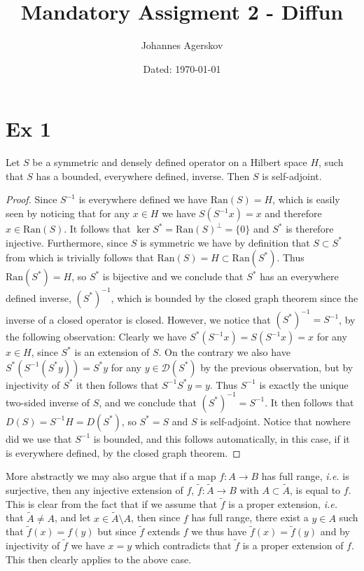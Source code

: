 \documentclass[a4paper,11pt]{article}
\author{Johannes Agerskov}
\date{Dated: \today}
\title{Mandatory Assigment 2 - Diffun}
\newcommand{\Ran}[1]{\text{Ran}\left(#1\right)}
\newcommand{\ie}{\emph{i.e.} }
\numberwithin{equation}{section}
\begin{document}
\maketitle	

\section*{Ex 1}
\setcounter{section}{1}
Let $ S $ be a symmetric and densely defined operator on a Hilbert space $ H $, such that $ S $ has a bounded, everywhere defined, inverse. Then $ S $ is self-adjoint.
\begin{proof}
	Since $ S^{-1} $ is everywhere defined we have $ \Ran{S}=H $, which is easily seen by noticing that for any $ x\in H $ we have $ S(S^{-1}x)=x $ and therefore $ x\in \Ran{S} $. It follows that $ \ker{S^*}=\Ran{S}^\perp=\{0\} $ and $ S^* $ is therefore injective. Furthermore, since $ S $ is symmetric we have by definition that $ S\subset S^* $ from which is trivially follows that $ \Ran{S}=H\subset\Ran{S^*} $. Thus $ \Ran{S^*}=H $, so $ S^* $ is bijective and we conclude that $ S^* $ has an everywhere defined inverse, $ (S^*)^{-1} $, which is bounded by the closed graph theorem since the inverse of a closed operator is closed. However, we notice that $ (S^*)^{-1}=S^{-1} $, by the following observation: Clearly we have $ S^*(S^{-1}x)=S(S^{-1}x)=x $ for any $ x\in H $, since $ S^* $ is an extension of $ S $. On the contrary we also have $ S^*(S^{-1}(S^*y))=S^*y $ for any $ y\in\mathcal{D}(S^*) $ by the previous observation, but by injectivity of $ S^* $ it then follows that $ S^{-1}S^*y=y $. Thus $ S^{-1} $ is exactly the unique two-sided inverse of $ S $, and we conclude that $ (S^*)^{-1}=S^{-1} $. It then follows that $ D(S)=S^{-1}H=D(S^*) $, so $ S^*=S $ and $ S $ is self-adjoint. Notice that nowhere did we use that $ S^{-1} $ is bounded, and this follows automatically, in this case, if it is everywhere defined, by the closed graph theorem.
\end{proof}
	More abstractly we may also argue that if a map $ f:A\to B $ has full range, \ie is surjective, then any injective extension of $ f $,  $ \tilde{f}:\tilde{A}\to B $ with $ A\subset\tilde{A} $, is equal to $ f $. 
	This is clear from the fact that if we assume that $ \tilde{f} $ is a proper extension, \ie that $ \tilde{A}\neq A $, and let $ x\in\tilde{A}\setminus A $, then since $ f $ has full range, there exist a $ y\in A $ such that $ \tilde{f}(x)=f(y) $ but since $ \tilde{f} $ extends $ f $ we thus have $ \tilde{f}(x)=\tilde{f}(y) $ and by injectivity of $ \tilde{f} $ we have $ x=y $ which contradicts that $ \tilde{f} $ is a proper extension of $ f $. This then clearly applies to the above case.
\pagebreak
\end{document}
